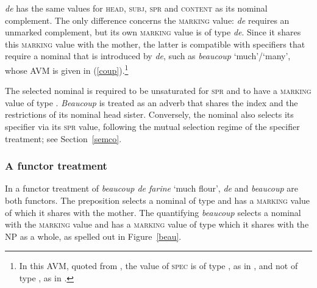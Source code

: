 \documentclass[output=paper
	        ,collection
	        ,collectionchapter
 	        ,biblatex
                ,babelshorthands
                ,newtxmath
                ,draftmode
                ,colorlinks, citecolor=brown
]{langscibook}
\begin{document}
\noindent
\emph{de} has the same values for \textsc{head}, \textsc{subj}, \textsc{spr} and 
\textsc{content} as its nominal complement. 
The only difference concerns the \textsc{marking} value: \emph{de} requires an 
unmarked complement, but its own \textsc{marking} value is of type \emph{de}. 
Since it shares this \textsc{marking} value with the mother, the latter is 
compatible with specifiers that require a nominal that is introduced by \emph{de}, 
such as \emph{beaucoup} `much'/`many', whose AVM is given in 
(\ref{coup}).\footnote{In this AVM, quoted from \citet[18]{Abeilleetal04}, 
the value of \textsc{spec} is of type , as in \citet{ps2}, and not of type 
, as in \citet{GS00}.}  

\begin{exe} 
\ex\label{coup} 
\end{exe} 

\noindent
The selected nominal is required to be unsaturated for \textsc{spr} and to have a 
\textsc{marking} value of type . \emph{Beaucoup} is treated as an adverb that  
shares the index and the restrictions of its nominal head sister. Conversely, the nominal
also selects its specifier via its \textsc{spr} value, following the mutual 
selection regime of the specifier treatment; see Section~\ref{semco}.


\subsubsection{A functor treatment} 


In a functor treatment of \emph{beaucoup de farine} `much flour', \emph{de} and 
\emph{beaucoup} are both functors. The preposition selects a nominal of type  and 
has a \textsc{marking} value of  which it shares with the mother. 
The quantifying \emph{beaucoup} selects a nominal with the \textsc{marking} value 
 and has a \textsc{marking} value of type  which it 
shares with the NP as a whole, as spelled out in Figure~\ref{beau}.
\end{document}
